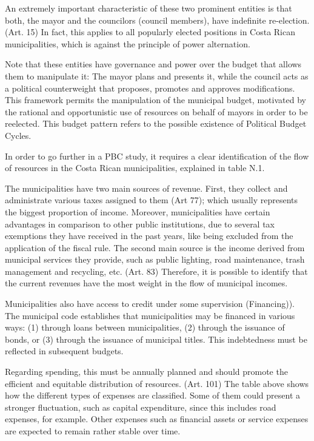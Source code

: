 An extremely important characteristic of these two prominent entities is that both, the mayor and the councilors (council members), have indefinite re-election. (Art. 15) In fact, this applies to all popularly elected positions in Costa Rican municipalities, which is against the principle of power alternation. 

Note that these entities have governance and power over the budget that allows them to manipulate it: The mayor plans and presents it, while the council acts as a political counterweight that proposes, promotes and approves modifications. This framework permits the manipulation of the municipal budget, motivated by the rational and opportunistic use of resources on behalf of mayors in order to be reelected. This budget pattern refers to the possible existence of Political Budget Cycles.

In order to go further in a PBC study, it requires a clear identification of the flow of resources in the Costa Rican municipalities, explained in table N.1.

The municipalities have two main sources of revenue. First, they collect and administrate various taxes assigned to them (Art 77); which usually represents the biggest proportion of income. Moreover, municipalities have certain advantages in comparison to other public institutions, due to several tax exemptions they have received in the past years, like being excluded from the application of the fiscal rule. The second main source is the income derived from municipal services they provide, such as public lighting, road maintenance, trash management and recycling, etc. (Art. 83)  Therefore, it is possible to identify that the current revenues have the most weight in the flow of municipal incomes.

Municipalities also have access to credit under some supervision (Financing)). The municipal code establishes that municipalities may be financed in various ways: (1) through loans between municipalities, (2) through the issuance of bonds, or (3) through the issuance of municipal titles. This indebtedness must be reflected in subsequent budgets.

Regarding spending, this must be annually planned and should promote the efficient and equitable distribution of resources. (Art. 101) The table above shows how the different types of expenses are classified. Some of them could present a stronger fluctuation, such as capital expenditure, since this includes road expenses, for example. Other expenses such as financial assets or service expenses are expected to remain rather stable over time.

